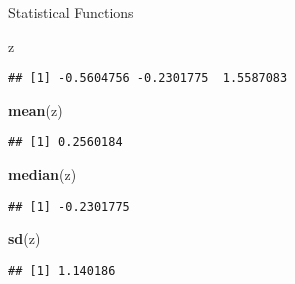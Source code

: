 \documentclass[ignorenonframetext,]{beamer}
\newenvironment{Shaded}{\begin{snugshade}}{\end{snugshade}}
\newcommand{\KeywordTok}[1]{\textcolor[rgb]{0.13,0.29,0.53}{\textbf{#1}}}
\newcommand{\NormalTok}[1]{#1}
\begin{document}
\begin{frame}[fragile]{Statistical Functions}
\protect\hypertarget{statistical-functions-1}{}

\begin{Shaded}
\begin{Highlighting}[]
\NormalTok{z}
\end{Highlighting}
\end{Shaded}

\begin{verbatim}
## [1] -0.5604756 -0.2301775  1.5587083
\end{verbatim}

\begin{Shaded}
\begin{Highlighting}[]
\KeywordTok{mean}\NormalTok{(z)}
\end{Highlighting}
\end{Shaded}

\begin{verbatim}
## [1] 0.2560184
\end{verbatim}

\begin{Shaded}
\begin{Highlighting}[]
\KeywordTok{median}\NormalTok{(z)}
\end{Highlighting}
\end{Shaded}

\begin{verbatim}
## [1] -0.2301775
\end{verbatim}

\begin{Shaded}
\begin{Highlighting}[]
\KeywordTok{sd}\NormalTok{(z)}
\end{Highlighting}
\end{Shaded}

\begin{verbatim}
## [1] 1.140186
\end{verbatim}

\end{frame}
\end{document}
